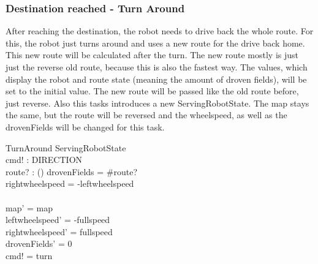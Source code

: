 \documentclass[11pt,a4paper]{article}
\begin{document}
\subsubsection{Destination reached - Turn Around}
After reaching the destination, the robot needs to drive back the whole route. For this, the robot just turns around and uses a new route for the drive back home. This new route will be calculated after the turn. The new route mostly is just just the reverse old route, because this is also the fastest way. The values, which display the robot and route state (meaning the amount of droven fields), will be set to the initial value. The new route will be passed like the old route before, just reverse. Also this tasks introduces a new ServingRobotState. The map stays the same, but the route will be reversed and the wheelspeed, as well as the drovenFields will be changed for this task.
\begin{schema}{TurnAround}
\Delta ServingRobotState\\
cmd! : DIRECTION\\
route? : \iseq (\nat \cross \nat)
\where
drovenFields = \#route?\\
rightwheelspeed = -leftwheelspeed\\
\\
map' = map\\
leftwheelspeed' = -fullspeed\\
rightwheelspeed' = fullspeed\\
drovenFields' = 0\\
cmd! = turn
\end{schema}
\end{document}
